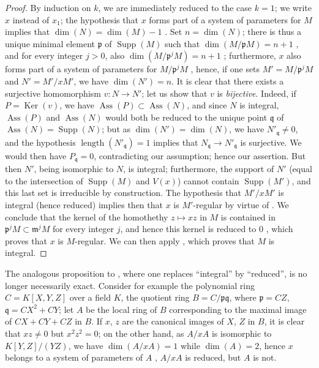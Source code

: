 \begin{proof}
By induction on $k$, we are immediately reduced to the case $k=1$; we write $x$ instead of $x_1$; the hypothesis that $x$ forms part of a system of parameters for $M$ implies that $\dim(N)=\dim(M)-1$ .
Set $n=\dim(N)$; there is thus a unique minimal element $\mathfrak{p}$ of $\operatorname{Supp}(M)$ such that $\dim(M/\mathfrak{p} M)=n+1$ , and for every integer $j>0$, also $\dim(M/\mathfrak{p}^j M)=n+1$ ; furthermore, $x$ also forms part of a system of parameters for $M/\mathfrak{p}^j M$ , hence, if one sets $M'=M/\mathfrak{p}^j M$ and $N'=M'/xM'$, we have $\dim(N')=n$.
It is clear that there exists a surjective homomorphism $v:N\to N'$; let us show that $v$ is \emph{bijective}.
Indeed, if $P=\operatorname{Ker}(v)$, we have $\operatorname{Ass}(P)\subset\operatorname{Ass}(N)$, and since $N$ is integral, $\operatorname{Ass}(P)$ and $\operatorname{Ass}(N)$ would both be reduced to the unique point $\mathfrak{q}$ of $\operatorname{Ass}(N)=\operatorname{Supp}(N)$; but as $\dim(N')=\dim(N)$, we have $N'_\mathfrak{q}\neq 0$, and the hypothesis $\operatorname{length}(N'_\mathfrak{q})=1$ implies that $N_\mathfrak{q}\to N'_\mathfrak{q}$ is surjective.
We would then have $P_\mathfrak{q}=0$, contradicting our assumption; hence our assertion.
But then $N'$, being isomorphic to $N$, is integral; furthermore, the support of $N'$ (equal to the intersection of $\operatorname{Supp}(M)$ and $V(x)$) cannot contain $\operatorname{Supp}(M')$, and this last set is irreducible by construction.
The hypothesis that $M'/xM'$ is integral (hence reduced) implies then that $x$ is $M'$-regular by virtue of .
We conclude that the kernel of the homothethy $z\mapsto xz$ in $M$ is contained in $\mathfrak{p}^j M\subset\mathfrak{m}^j M$ for every integer $j$, and hence this kernel is reduced to $0$ , which proves that $x$ is $M$-regular.
We can then apply , which proves that $M$ is integral.
\end{proof}

\begin{remark}[3.4.8]
\label{IV.3.4.8}
The analogous proposition to , where one replaces ``integral'' by ``reduced'', is no longer necessarily exact.
Consider for example the polynomial ring $C=K[X,Y,Z]$ over a field $K$, the quotient ring $B=C/\mathfrak{p}\mathfrak{q}$, where $\mathfrak{p}=CZ$, $\mathfrak{q}=CX^2+CY$; let $A$ be the local ring of $B$ corresponding to the maximal image of $CX+CY+CZ$ in $B$.
If $x$, $z$ are the canonical images of $X$, $Z$ in $B$, it is clear that $xz\neq 0$ but $x^2z^2=0$; on the other hand, as $A/xA$ is isomorphic to $K[Y,Z]/(YZ)$, we have $\dim(A/xA)=1$ while $\dim(A)=2$, hence $x$ belongs to a system of parameters of $A$ , $A/xA$ is reduced, but $A$ is not.
\end{remark}

